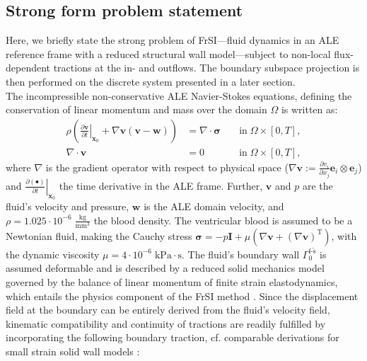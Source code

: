 \subsection*{Strong form problem statement}
Here, we briefly state the strong problem of FrSI---fluid dynamics in an ALE reference frame \cite{donea1982,duarte2004} with a reduced structural wall model---subject to non-local flux-dependent tractions at the in- and outflows. The boundary subspace projection is then performed on the discrete system presented in a later section.\\

The incompressible non-conservative ALE Navier-Stokes equations, defining the conservation of linear momentum and mass over the domain $\mathit{\mathit{\Omega}}$ is written as:
\begin{align}
	\rho\left(\left.\frac{\partial \boldsymbol{v}}{\partial t}\right|_{\boldsymbol{x}_{0}} + \nabla\boldsymbol{v} (\boldsymbol{v}-\boldsymbol{w})\right) &= \nabla\cdot\boldsymbol{\sigma} && \;\text{in}\; \mathit{\mathit{\Omega}} \times [0,T], \label{eq:ns_strong_mom}\\
	\nabla\cdot\boldsymbol{v} &= 0 && \;\text{in}\; \mathit{\mathit{\Omega}} \times [0,T], \label{eq:ns_strong_mass}
\end{align}
where $\nabla$ is the gradient operator with respect to physical space ($\nabla\boldsymbol{v}:=\frac{\partial v_{i}}{\partial x_{j}}\boldsymbol{e}_{i}\otimes\boldsymbol{e}_{j}$) and $\left.\frac{\partial (\bullet)}{\partial t}\right|_{\boldsymbol{x}_{0}}$ the time derivative in the ALE frame. Further, $\boldsymbol{v}$ and $p$ are the fluid's velocity and pressure, $\boldsymbol{w}$ is the ALE domain velocity, and $\rho=1.025\cdot 10^{-6}\;\frac{\mathrm{kg}}{\mathrm{mm}^{3}}$ the blood density. 
The ventricular blood is assumed to be a Newtonian fluid, making the Cauchy stress $\boldsymbol{\sigma} = -p \boldsymbol{I} + \mu \left(\nabla \boldsymbol{v} + (\nabla \boldsymbol{v})^{\mathrm{T}}\right)$, with the dynamic viscosity $\mu=4\cdot 10^{-6}\;\mathrm{kPa\cdot s}$. 
The fluid's boundary wall $\mathit{\Gamma}_{0}^{\mathrm{f}\text{-}\tilde{\mathrm{s}}}$ is assumed deformable and is described by a reduced solid mechanics model governed by the balance of linear momentum of finite strain elastodynamics, which entails the physics component of the FrSI method \cite{hirschvogel2024-frsi}. 
Since the displacement field at the boundary can be entirely derived from the fluid's velocity field, kinematic compatibility and continuity of tractions are readily fulfilled by incorporating the following boundary traction, cf. comparable derivations for small strain solid wall models \cite{colciago2014}:
